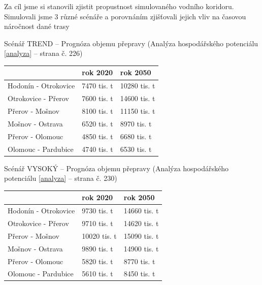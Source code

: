 \documentclass[11pt,a4paper]{article}
\begin{document}
    Za cíl jsme si stanovili zjistit propustnost simulovaného vodního koridoru.
    Simulovali jsme 3 různé scénáře a porovnáním zjišťovali jejich vliv na časovou
    náročnost dané trasy

    \break

    \noindent 
    Scénář TREND -- Prognóza objemu přepravy (Analýza hospodářského
    potenciálu \ref{analyza} -- strana č. 226)
    \begin{center}
      \begin{tabular}{| l | l | l |}
        \hline
        & rok 2020 & rok 2050 \\ \hline
        Hodonín - Otrokovice & 7470 tis. t & 10280 tis. t \\ \hline
        Otrokovice - Přerov & 7600 tis. t & 14600 tis. t \\ \hline
        Přerov - Mošnov &  8100 tis. t & 11150 tis. t \\ \hline
        Mošnov - Ostrava & 6520 tis. t & 8970 tis. t \\ \hline
        Přerov - Olomouc & 4850 tis. t & 6680 tis. t \\ \hline
        Olomouc - Pardubice & 4740 tis. t & 6530 tis. t \\ \hline
        \end{tabular}
    \end{center}

    \noindent 
    Scénář VYSOKÝ -- Prognóza objemu přepravy (Analýza hospodářského
    potenciálu \ref{analyza} -- strana č. 230)
    \begin{center}
      \begin{tabular}{| l | l | l |}
        \hline
        & rok 2020 & rok 2050 \\ \hline
        Hodonín - Otrokovice & 9730 tis. t & 14660 tis. t \\ \hline
        Otrokovice - Přerov & 9710 tis. t & 14620 tis. t \\ \hline
        Přerov - Mošnov & 10020 tis. t & 15090 tis. t \\ \hline
        Mošnov - Ostrava & 9890 tis. t & 14900 tis. t \\ \hline
        Přerov - Olomouc & 5820 tis. t & 8770 tis. t \\ \hline
        Olomouc - Pardubice & 5610 tis. t & 8450 tis. t \\ \hline
        \end{tabular}
    \end{center}
\end{document}
